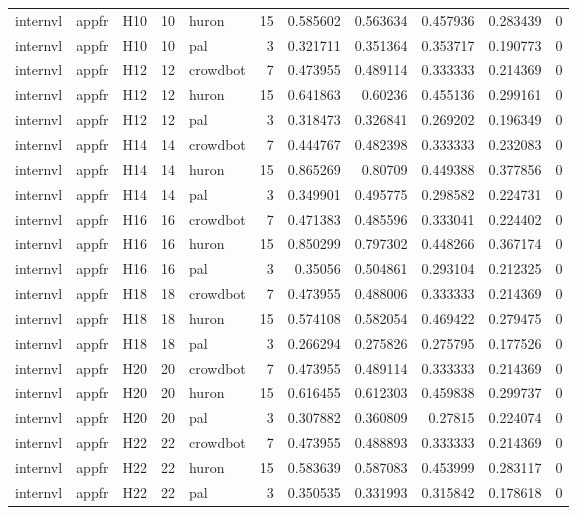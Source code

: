 \begin{longtable}{lllrlrrrrrr}
internvl & appfr & H10 & 10 & huron & 15 & 0.585602 & 0.563634 & 0.457936 & 0.283439 & 0 \\
internvl & appfr & H10 & 10 & pal & 3 & 0.321711 & 0.351364 & 0.353717 & 0.190773 & 0 \\
internvl & appfr & H12 & 12 & crowdbot & 7 & 0.473955 & 0.489114 & 0.333333 & 0.214369 & 0 \\
internvl & appfr & H12 & 12 & huron & 15 & 0.641863 & 0.60236 & 0.455136 & 0.299161 & 0 \\
internvl & appfr & H12 & 12 & pal & 3 & 0.318473 & 0.326841 & 0.269202 & 0.196349 & 0 \\
internvl & appfr & H14 & 14 & crowdbot & 7 & 0.444767 & 0.482398 & 0.333333 & 0.232083 & 0 \\
internvl & appfr & H14 & 14 & huron & 15 & 0.865269 & 0.80709 & 0.449388 & 0.377856 & 0 \\
internvl & appfr & H14 & 14 & pal & 3 & 0.349901 & 0.495775 & 0.298582 & 0.224731 & 0 \\
internvl & appfr & H16 & 16 & crowdbot & 7 & 0.471383 & 0.485596 & 0.333041 & 0.224402 & 0 \\
internvl & appfr & H16 & 16 & huron & 15 & 0.850299 & 0.797302 & 0.448266 & 0.367174 & 0 \\
internvl & appfr & H16 & 16 & pal & 3 & 0.35056 & 0.504861 & 0.293104 & 0.212325 & 0 \\
internvl & appfr & H18 & 18 & crowdbot & 7 & 0.473955 & 0.488006 & 0.333333 & 0.214369 & 0 \\
internvl & appfr & H18 & 18 & huron & 15 & 0.574108 & 0.582054 & 0.469422 & 0.279475 & 0 \\
internvl & appfr & H18 & 18 & pal & 3 & 0.266294 & 0.275826 & 0.275795 & 0.177526 & 0 \\
internvl & appfr & H20 & 20 & crowdbot & 7 & 0.473955 & 0.489114 & 0.333333 & 0.214369 & 0 \\
internvl & appfr & H20 & 20 & huron & 15 & 0.616455 & 0.612303 & 0.459838 & 0.299737 & 0 \\
internvl & appfr & H20 & 20 & pal & 3 & 0.307882 & 0.360809 & 0.27815 & 0.224074 & 0 \\
internvl & appfr & H22 & 22 & crowdbot & 7 & 0.473955 & 0.488893 & 0.333333 & 0.214369 & 0 \\
internvl & appfr & H22 & 22 & huron & 15 & 0.583639 & 0.587083 & 0.453999 & 0.283117 & 0 \\
internvl & appfr & H22 & 22 & pal & 3 & 0.350535 & 0.331993 & 0.315842 & 0.178618 & 0 \\

\end{longtable}
